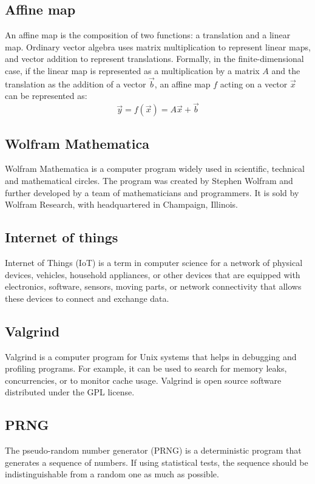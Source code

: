 \documentclass[thesis=M,english]{FITthesis}[2019/12/23]
\begin{document}
\subsection{Affine map}
An affine map is the composition of two functions: a translation and a linear map. Ordinary vector algebra uses matrix multiplication to represent linear maps, and vector addition to represent translations. Formally, in the finite-dimensional case, if the linear map is represented as a multiplication by a matrix $A$ and the translation as the addition of a vector $\vec {b}$, an affine map $f$ acting on a vector ${\vec {x}}$ can be represented as:
\[
{\vec {y}}=f({\vec {x}})=A{\vec {x}}+{\vec {b}}
\]

\subsection{Wolfram Mathematica}
Wolfram Mathematica is a computer program widely used in scientific, technical and mathematical circles. The program was created by Stephen Wolfram and further developed by a team of mathematicians and programmers. It is sold by Wolfram Research, with headquartered in Champaign, Illinois.

\subsection{Internet of things}
Internet of Things (IoT) is a term in computer science for a network of physical devices, vehicles, household appliances, or other devices that are equipped with electronics, software, sensors, moving parts, or network connectivity that allows these devices to connect and exchange data.

\subsection{Valgrind}
Valgrind is a computer program for Unix systems that helps in debugging and profiling programs. For example, it can be used to search for memory leaks, concurrencies, or to monitor cache usage. Valgrind is open source software distributed under the GPL license.

\subsection{PRNG}
The pseudo-random number generator (PRNG) is a deterministic program that generates a sequence of numbers. If using statistical tests, the sequence should be indistinguishable from a random one as much as possible.
\end{document}
